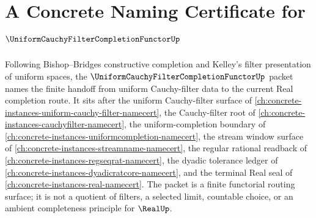 \chapter{A Concrete Naming Certificate for $\UniformCauchyFilterCompletionFunctorUp$}
\label{ch:concrete-instances-uniform-cauchy-filter-completion-functor-namecert}

Following Bishop--Bridges constructive completion and Kelley's filter presentation of uniform spaces, the $\UniformCauchyFilterCompletionFunctorUp$ packet names the finite handoff from uniform Cauchy-filter data to the current Real completion route. It sits after the uniform Cauchy-filter surface of \autoref{ch:concrete-instances-uniform-cauchy-filter-namecert}, the Cauchy-filter root of \autoref{ch:concrete-instances-cauchyfilter-namecert}, the uniform-completion boundary of \autoref{ch:concrete-instances-uniformcompletion-namecert}, the stream window surface of \autoref{ch:concrete-instances-streamname-namecert}, the regular rational readback of \autoref{ch:concrete-instances-regseqrat-namecert}, the dyadic tolerance ledger of \autoref{ch:concrete-instances-dyadicratcore-namecert}, and the terminal Real seal of \autoref{ch:concrete-instances-real-namecert}. The packet is a finite functorial routing surface; it is not a quotient of filters, a selected limit, countable choice, or an ambient completeness principle for $\RealUp$.

